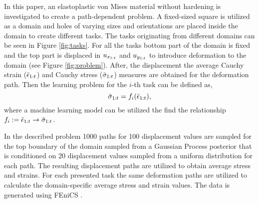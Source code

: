 In this paper, an elastoplastic von Mises material without hardening is investigated to create a path-dependent problem. A fixed-sized square is utilized as a domain and holes of varying sizes and orientations are placed inside the domain to create different tasks. The tasks originating from different domains can be seen in Figure \ref{fig:tasks}. For all the tasks bottom part of the domain is fixed and the top part is displaced in $u_{x_{1:t}}$ and $u_{y_{1:t}}$ to introduce deformation to the domain (see Figure \ref{fig:problem}). After, the displacement the average Cauchy strain ($\bar{\epsilon}_{1:t}$) and Cauchy stress ($\bar{\sigma}_{1:t}$) measures are obtained for the deformation path. Then the learning problem for the $i$-th task can be defined as,
\begin{equation}
  \bar{\sigma}_{1:t} = f_i(\bar{\epsilon}_{1:t}),
\end{equation}
where a machine learning model can be utilized the find the relationship $f_i:=\bar{\epsilon}_{1:t} \to \bar{\sigma}_{1:t}$. 


In the described problem 1000 paths for 100 displacement values are sampled for the top boundary of the domain sampled from a Gaussian Process posterior that is conditioned on 20 displacement values sampled from a uniform distribution for each path. The resulting displacement paths are utilized to obtain average stress and strains. For each presented task the same deformation paths are utilized to calculate the domain-specific average stress and strain values. The data is generated using FEniCS \cite{logg2012a}. 






